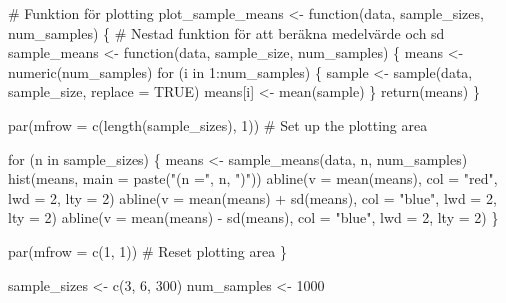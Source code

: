 \documentclass[
  letterpaper,
  DIV=11,
  numbers=noendperiod]{scrartcl}
\newenvironment{Shaded}{\begin{snugshade}}{\end{snugshade}}
\newcommand{\AttributeTok}[1]{\textcolor[rgb]{0.40,0.45,0.13}{#1}}
\newcommand{\CommentTok}[1]{\textcolor[rgb]{0.37,0.37,0.37}{#1}}
\newcommand{\ConstantTok}[1]{\textcolor[rgb]{0.56,0.35,0.01}{#1}}
\newcommand{\ControlFlowTok}[1]{\textcolor[rgb]{0.00,0.23,0.31}{#1}}
\newcommand{\DecValTok}[1]{\textcolor[rgb]{0.68,0.00,0.00}{#1}}
\newcommand{\FunctionTok}[1]{\textcolor[rgb]{0.28,0.35,0.67}{#1}}
\newcommand{\NormalTok}[1]{\textcolor[rgb]{0.00,0.23,0.31}{#1}}
\newcommand{\OtherTok}[1]{\textcolor[rgb]{0.00,0.23,0.31}{#1}}
\newcommand{\SpecialCharTok}[1]{\textcolor[rgb]{0.37,0.37,0.37}{#1}}
\newcommand{\StringTok}[1]{\textcolor[rgb]{0.13,0.47,0.30}{#1}}
\begin{document}
\begin{Shaded}
\begin{Highlighting}[]
\CommentTok{\# Funktion för plotting}
\NormalTok{plot\_sample\_means }\OtherTok{\textless{}{-}} \ControlFlowTok{function}\NormalTok{(data, sample\_sizes, num\_samples) \{}
  \CommentTok{\# Nestad funktion för att beräkna medelvärde och sd}
\NormalTok{  sample\_means }\OtherTok{\textless{}{-}} \ControlFlowTok{function}\NormalTok{(data, sample\_size, num\_samples) \{}
\NormalTok{    means }\OtherTok{\textless{}{-}} \FunctionTok{numeric}\NormalTok{(num\_samples)}
    \ControlFlowTok{for}\NormalTok{ (i }\ControlFlowTok{in} \DecValTok{1}\SpecialCharTok{:}\NormalTok{num\_samples) \{}
\NormalTok{      sample }\OtherTok{\textless{}{-}} \FunctionTok{sample}\NormalTok{(data, sample\_size, }\AttributeTok{replace =} \ConstantTok{TRUE}\NormalTok{)}
\NormalTok{      means[i] }\OtherTok{\textless{}{-}} \FunctionTok{mean}\NormalTok{(sample)}
\NormalTok{    \}}
    \FunctionTok{return}\NormalTok{(means)}
\NormalTok{  \}}
  
  \FunctionTok{par}\NormalTok{(}\AttributeTok{mfrow =} \FunctionTok{c}\NormalTok{(}\FunctionTok{length}\NormalTok{(sample\_sizes), }\DecValTok{1}\NormalTok{))  }\CommentTok{\# Set up the plotting area}
  
  \ControlFlowTok{for}\NormalTok{ (n }\ControlFlowTok{in}\NormalTok{ sample\_sizes) \{}
\NormalTok{    means }\OtherTok{\textless{}{-}} \FunctionTok{sample\_means}\NormalTok{(data, n, num\_samples)}
    \FunctionTok{hist}\NormalTok{(means, }\AttributeTok{main =} \FunctionTok{paste}\NormalTok{(}\StringTok{"(n ="}\NormalTok{, n, }\StringTok{")"}\NormalTok{))}
    \FunctionTok{abline}\NormalTok{(}\AttributeTok{v =} \FunctionTok{mean}\NormalTok{(means), }\AttributeTok{col =} \StringTok{"red"}\NormalTok{, }\AttributeTok{lwd =} \DecValTok{2}\NormalTok{, }\AttributeTok{lty =} \DecValTok{2}\NormalTok{)}
    \FunctionTok{abline}\NormalTok{(}\AttributeTok{v =} \FunctionTok{mean}\NormalTok{(means) }\SpecialCharTok{+} \FunctionTok{sd}\NormalTok{(means), }\AttributeTok{col =} \StringTok{"blue"}\NormalTok{, }\AttributeTok{lwd =} \DecValTok{2}\NormalTok{, }\AttributeTok{lty =} \DecValTok{2}\NormalTok{)}
    \FunctionTok{abline}\NormalTok{(}\AttributeTok{v =} \FunctionTok{mean}\NormalTok{(means) }\SpecialCharTok{{-}} \FunctionTok{sd}\NormalTok{(means), }\AttributeTok{col =} \StringTok{"blue"}\NormalTok{, }\AttributeTok{lwd =} \DecValTok{2}\NormalTok{, }\AttributeTok{lty =} \DecValTok{2}\NormalTok{)}
\NormalTok{  \}}
  
  \FunctionTok{par}\NormalTok{(}\AttributeTok{mfrow =} \FunctionTok{c}\NormalTok{(}\DecValTok{1}\NormalTok{, }\DecValTok{1}\NormalTok{))  }\CommentTok{\# Reset plotting area}
\NormalTok{\}}

\NormalTok{sample\_sizes }\OtherTok{\textless{}{-}} \FunctionTok{c}\NormalTok{(}\DecValTok{3}\NormalTok{, }\DecValTok{6}\NormalTok{, }\DecValTok{300}\NormalTok{)}
\NormalTok{num\_samples }\OtherTok{\textless{}{-}} \DecValTok{1000}
\end{Highlighting}
\end{Shaded}
\end{document}
